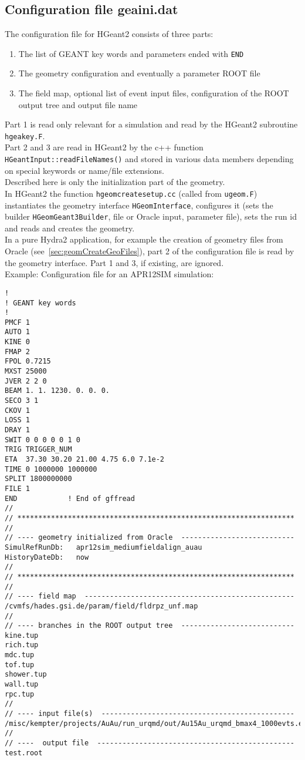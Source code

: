 \subsection[Configuration file geaini.dat]{Configuration file geaini.dat} \label{sec:geomGeaini}

The configuration file for HGeant2 consists of three parts:
\begin{enumerate}
 \setlength{\itemsep}{0pt}
 \item The list of GEANT key words and parameters ended with \verb+END+
 \item The geometry configuration and eventually a parameter ROOT file
 \item The field map, optional list of event input files, configuration of the ROOT output tree and output file name
\end{enumerate}
Part 1 is read only relevant for a simulation and read by the HGeant2 subroutine \verb+hgeakey.F+.\\
Part 2 and 3 are read in HGeant2 by the c++ function \verb+HGeantInput::readFileNames()+ and stored in various data members depending 
on special keywords or name/file extensions.\\

Described here is only the initialization part of the geometry.\\
In HGeant2 the function \verb+hgeomcreatesetup.cc+ (called from \verb+ugeom.F+) instantiates the geometry interface \verb+HGeomInterface+, 
configures it (sets the builder \verb+HGeomGeant3Builder+, file or Oracle input, parameter file), sets the run id and reads and 
creates the geometry.\\
In a pure Hydra2 application, for example the creation of geometry files from Oracle (see~\ref{sec:geomCreateGeoFiles}), 
part 2 of the configuration file is read by the geometry interface. Part 1 and 3, if existing, are ignored.\\  

Example: Configuration file for an APR12SIM simulation:
\begin{lstlisting}
!
! GEANT key words
!
PMCF 1
AUTO 1
KINE 0
FMAP 2
FPOL 0.7215
MXST 25000
JVER 2 2 0
BEAM 1. 1. 1230. 0. 0. 0.
SECO 3 1
CKOV 1
LOSS 1
DRAY 1
SWIT 0 0 0 0 0 1 0
TRIG TRIGGER_NUM
ETA  37.30 30.20 21.00 4.75 6.0 7.1e-2
TIME 0 1000000 1000000
SPLIT 1800000000
FILE 1
END            ! End of gffread
//
// ******************************************************************
//
// ---- geometry initialized from Oracle  ---------------------------
SimulRefRunDb:   apr12sim_mediumfieldalign_auau
HistoryDateDb:   now
//
// ******************************************************************
//
// ---- field map  --------------------------------------------------
/cvmfs/hades.gsi.de/param/field/fldrpz_unf.map
//
// ---- branches in the ROOT output tree  ---------------------------
kine.tup
rich.tup
mdc.tup
tof.tup
shower.tup
wall.tup
rpc.tup
//
// ---- input file(s)  ----------------------------------------------
/misc/kempter/projects/AuAu/run_urqmd/out/Au15Au_urqmd_bmax4_1000evts.evt
//
// ----  output file  -----------------------------------------------
test.root
\end{lstlisting}

